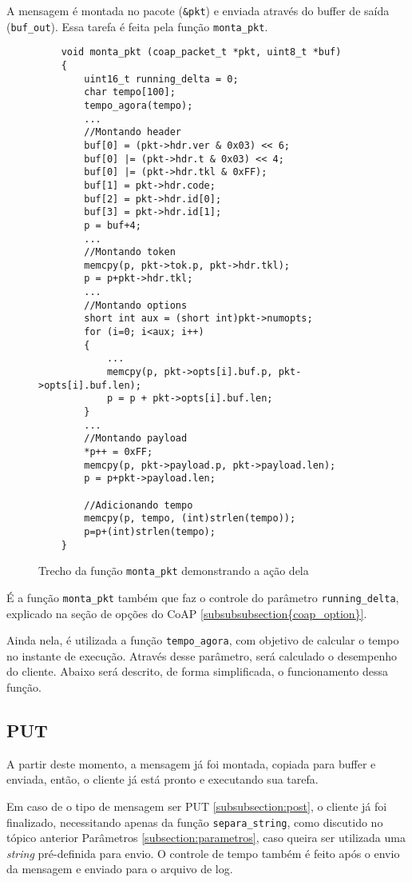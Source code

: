 A mensagem é montada no pacote (\texttt{\&pkt}) e enviada através do buffer de saída (\texttt{buf\_out}). Essa tarefa é feita pela função \texttt{monta\_pkt}.
\begin{figure}[!htb]
	\begin{lstlisting}
	void monta_pkt (coap_packet_t *pkt, uint8_t *buf)
	{
		uint16_t running_delta = 0;
		char tempo[100];
		tempo_agora(tempo);
		...
		//Montando header
		buf[0] = (pkt->hdr.ver & 0x03) << 6;
		buf[0] |= (pkt->hdr.t & 0x03) << 4;
		buf[0] |= (pkt->hdr.tkl & 0xFF);
		buf[1] = pkt->hdr.code;
		buf[2] = pkt->hdr.id[0];
		buf[3] = pkt->hdr.id[1];
		p = buf+4;
		...
		//Montando token
		memcpy(p, pkt->tok.p, pkt->hdr.tkl);
		p = p+pkt->hdr.tkl;
		...
		//Montando options
		short int aux = (short int)pkt->numopts;
		for (i=0; i<aux; i++)
		{
			...
			memcpy(p, pkt->opts[i].buf.p, pkt->opts[i].buf.len);
			p = p + pkt->opts[i].buf.len;
		}
		...
		//Montando payload
		*p++ = 0xFF;
		memcpy(p, pkt->payload.p, pkt->payload.len);
		p = p+pkt->payload.len;
		
		//Adicionando tempo
		memcpy(p, tempo, (int)strlen(tempo));
		p=p+(int)strlen(tempo);
	}
	\end{lstlisting}
	\caption{Trecho da função \texttt{monta\_pkt} demonstrando a ação dela}
	\label{code:montar_pkt}
\end{figure}

É a função \texttt{monta\_pkt} também que faz o controle do parâmetro \texttt{running\_delta}, explicado na seção de opções do CoAP \ref{subsubsubsection{coap_option}}.

Ainda nela, é utilizada a função \texttt{tempo\_agora}, com objetivo de calcular o tempo no instante de execução. Através desse parâmetro, será calculado o desempenho do cliente. Abaixo será descrito, de forma simplificada, o funcionamento dessa função.

\verb||

\subsection{PUT}

A partir deste momento, a mensagem já foi montada, copiada para buffer e enviada, então, o cliente já está pronto e executando sua tarefa. 

Em caso de o tipo de mensagem ser PUT \ref{subsubsection:post}, o cliente já foi finalizado, necessitando apenas da função \texttt{separa\_string}, como discutido no tópico anterior Parâmetros \ref{subsection:parametros}, caso queira ser utilizada uma \textit{string} pré-definida para envio. O controle de tempo também é feito após o envio da mensagem e enviado para o arquivo de log.

